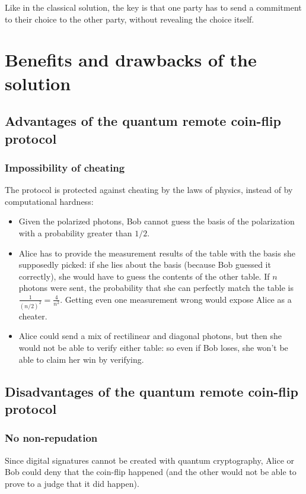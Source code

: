 \documentclass[oneside,a4paper]{article}
\begin{document}
Like in the classical solution, the key is that one party has to send a commitment to their choice to the other party, without revealing the choice itself.

\section{Benefits and drawbacks of the solution}

\subsection{Advantages of the quantum remote coin-flip protocol}

\subsubsection{Impossibility of cheating}
The protocol is protected against cheating by the laws of physics, instead of by computational hardness:

\begin{itemize}
	\item Given the polarized photons, Bob cannot guess the basis of the polarization with a probability greater than $1/2$.
	\item Alice has to provide the measurement results of the table with the basis she supposedly picked: if she lies about the basis (because Bob guessed it correctly), she would have to guess the contents of the other table.
	If $n$ photons were sent, the probability that she can perfectly match the table is $\frac{1}{(n/2)^2}=\frac{4}{n^2}$.
	Getting even one measurement wrong would expose Alice as a cheater.
	\item Alice could send a mix of rectilinear and diagonal photons, but then she would not be able to verify either table: so even if Bob loses, she won't be able to claim her win by verifying.	
\end{itemize}

\subsection{Disadvantages of the quantum remote coin-flip protocol}

\subsubsection{No non-repudation} Since digital signatures cannot be created with quantum cryptography, Alice or Bob could deny that the coin-flip happened (and the other would not be able to prove to a judge that it did happen).
\end{document}
